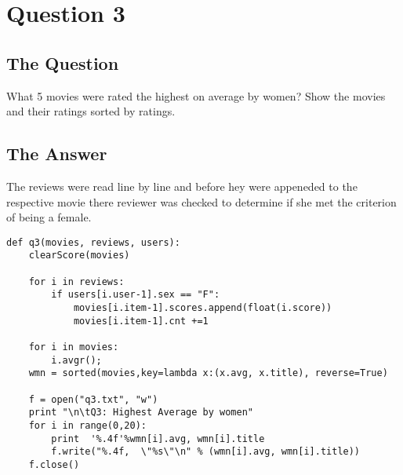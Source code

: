 \section{Question 3}

\subsection{The Question}

\begin{flushleft}

What 5 movies were rated the highest on average by women? Show
the movies and their ratings sorted by ratings.

\end{flushleft}
\subsection{The Answer}

The reviews were read line by line and before hey were appeneded to the respective movie there reviewer was checked to determine if she met the criterion of being a female. 


\begin{lstlisting}[caption={Python code for question 3}]
def q3(movies, reviews, users):
	clearScore(movies)

	for i in reviews:
		if users[i.user-1].sex == "F":
			movies[i.item-1].scores.append(float(i.score))
			movies[i.item-1].cnt +=1

	for i in movies:
		i.avgr(); 
	wmn = sorted(movies,key=lambda x:(x.avg, x.title), reverse=True)

	f = open("q3.txt", "w")
	print "\n\tQ3: Highest Average by women"
	for i in range(0,20):
		print  '%.4f'%wmn[i].avg, wmn[i].title
		f.write("%.4f,  \"%s\"\n" % (wmn[i].avg, wmn[i].title))
	f.close()
\end{lstlisting}


